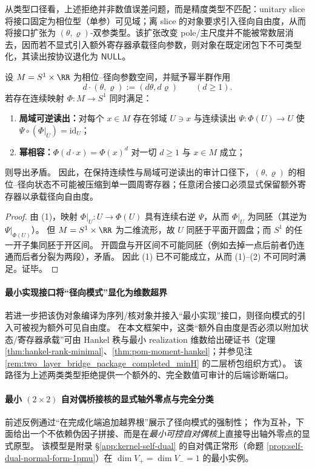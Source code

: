 从类型口径看，上述拒绝并非数值误差问题，而是精度类型不匹配：unitary slice 将接口固定为相位型（单参）可见域；离 slice 的对象要求引入径向自由度，从而将接口扩张为 \((\theta,\varrho)\)-双参类型。该扩张改变 pole/主尺度并不能被常数层消去，因而若不显式引入额外寄存器承载径向参数，则对象在既定闭包下不可类型化，其读出按协议退化为 \(\mathsf{NULL}\)。

\begin{theorem}\label{thm:radial-dimension-obstruction}
设 \(M=S^{1}\times\RR\) 为相位--径向参数空间，并赋予幂半群作用
\[
d\cdot(\theta,\varrho):=(d\theta,d\varrho)\qquad(d\ge 1).
\]
若存在连续映射 \(\Phi:M\to S^{1}\) 同时满足：
\begin{enumerate}
  \item \textbf{局域可逆读出：}对每个 \(x\in M\) 存在邻域 \(U\ni x\) 与连续读出 \(\Psi:\Phi(U)\to U\) 使 \(\Psi\circ(\Phi|_{U})=\mathrm{id}_{U}\)；
  \item \textbf{幂相容：}\(\Phi(d\cdot x)=\Phi(x)^{d}\) 对一切 \(d\ge 1\) 与 \(x\in M\) 成立；
\end{enumerate}
则导出矛盾。
因此，在保持连续性与局域可逆读出的审计口径下，\((\theta,\varrho)\) 的相位--径向状态不可能被压缩到单一圆周寄存器；任意闭合接口必须显式保留额外寄存器以承载径向自由度。
\end{theorem}
\begin{proof}
由 (1)，映射 \(\Phi|_{U}:U\to \Phi(U)\) 具有连续右逆 \(\Psi\)，从而 \(\Phi|_{U}\) 为同胚（其逆为 \(\Psi|_{\Phi(U)}\)）。
但 \(M=S^{1}\times\RR\) 为二维流形，故 \(U\) 同胚于平面开圆盘；而 \(S^{1}\) 的任一开子集同胚于开区间。
开圆盘与开区间不可能同胚（例如去掉一点后前者仍连通而后者分裂为两段），矛盾。
因此 (1) 已不可能成立，从而 (1)--(2) 不可同时满足。证毕。
\end{proof}

\paragraph{最小实现接口将“径向模式”显化为维数超界}
若进一步把该伪对象编译为序列/核对象并接入“最小实现”接口，则径向模式的引入可被视为额外可见自由度。
在本文框架中，这类“额外自由度是否必须以附加状态/寄存器承载”可由 Hankel 秩与最小 realization 维数给出硬证书（定理 \ref{thm:hankel-rank-minimal}、\ref{thm:pom-moment-hankel}；并参见注 \ref{rem:two_layer_bridge_package_completed_minH} 的二层桥包组织方式）。
该路径为上述两类类型拒绝提供一个额外的、完全数值可审计的后端诊断端口。

\paragraph{最小 \texorpdfstring{$(2\times2)$}{(2x2)} 自对偶桥接核的显式轴外零点与完全分类}
前述反例通过“在完成化端追加越界根”展示了径向模式的强制性；
作为互补，下面给出一个不依赖伪因子拼接、而是在\emph{最小可控自对偶核}上直接导出轴外零点的显式原型。
该模型是附录 \S\ref{app:kernel-self-dual} 的自对偶正常形（命题 \ref{prop:self-dual-normal-form-1pmu}）在 \(\dim V_+=\dim V_-=1\) 的最小实例。

